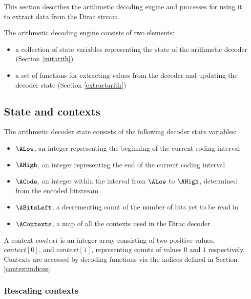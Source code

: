 
\label{arithdecoding}

This section describes the arithmetic decoding engine and
processes for using it to extract data from the Dirac stream.

The arithmetic decoding engine consists of two elements: 

\begin{itemize}
\item a collection of state variables representing the state of the arithmetic 
decoder (Section \ref{initarith})
\item a set of functions for extracting values from the decoder 
and updating the decoder state (Section \ref{extractarith})
\end{itemize}

\subsection{State and contexts}
\label{arithcontexts}

The arithmetic decoder state consists of the following decoder state variables:

\begin{itemize}
\item $\ALow$, an integer representing the beginning of the current coding interval
\item $\AHigh$, an integer representing the end of the current coding interval
\item $\ACode$, an integer within the interval from $\ALow$ to $\AHigh$, determined from the encoded bitstream
\item $\ABitsLeft$, a decrementing count of the number of bits yet to be read in
\item $\AContexts$, a map of all the contexts used in the Dirac decoder
\end{itemize}

A context $context$ is an integer array consisting of two positive values,
$context[0]$, and $context[1]$, representing counts of values $0$ and $1$
respectively. Contexts are accessed by decoding functions
via the indices defined in Section \ref{contextindices}.

\subsubsection{Rescaling contexts}
\label{rescalecontext}

